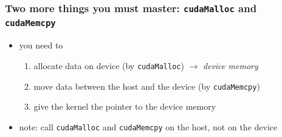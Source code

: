 \documentclass[12pt,dvipdfmx]{beamer}
\newcommand{\ao}[1]{{\color{blue}#1}}
\begin{document}
\begin{frame}[fragile]
  \frametitle{Two more things you must master:
    {\tt cudaMalloc} and {\tt cudaMemcpy}}
\begin{itemize}
\item you need to
  \begin{enumerate}
  \item<2-> allocate data on device (by \ao{\tt cudaMalloc})
    $\rightarrow$ {\it device memory}
  \item<3-> move data between the host and the device (by \ao{\tt cudaMemcpy})
  \item<4-> give the kernel the pointer to the device memory
  \end{enumerate}
\item<5-> note: call \ao{\tt cudaMalloc} and \ao{\tt cudaMemcpy}
  on the host, not on the device
\end{itemize}

  \begin{center}
%
%
  \end{center}
\end{frame}
\end{document}
